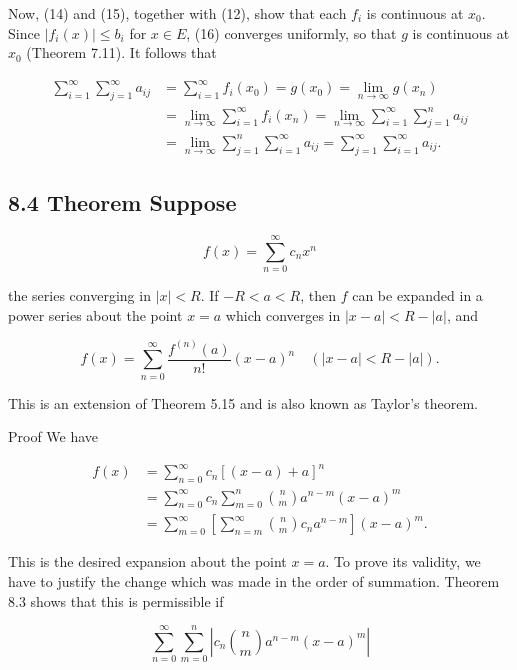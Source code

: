 \documentclass[10pt]{article}
\begin{document}
Now, (14) and (15), together with (12), show that each $f_{i}$ is continuous at $x_{0}$. Since $\left|f_{i}(x)\right| \leq b_{i}$ for $x \in E$, (16) converges uniformly, so that $g$ is continuous at $x_{0}$ (Theorem 7.11). It follows that

$$
\begin{aligned}
\sum_{i=1}^{\infty} \sum_{j=1}^{\infty} a_{i j} & =\sum_{i=1}^{\infty} f_{i}\left(x_{0}\right)=g\left(x_{0}\right)=\lim _{n \rightarrow \infty} g\left(x_{n}\right) \\
& =\lim _{n \rightarrow \infty} \sum_{i=1}^{\infty} f_{i}\left(x_{n}\right)=\lim _{n \rightarrow \infty} \sum_{i=1}^{\infty} \sum_{j=1}^{n} a_{i j} \\
& =\lim _{n \rightarrow \infty} \sum_{j=1}^{n} \sum_{i=1}^{\infty} a_{i j}=\sum_{j=1}^{\infty} \sum_{i=1}^{\infty} a_{i j} .
\end{aligned}
$$

\subsection*{8.4 Theorem Suppose}
$$
f(x)=\sum_{n=0}^{\infty} c_{n} x^{n}
$$

the series converging in $|x|<R$. If $-R<a<R$, then $f$ can be expanded in a power series about the point $x=a$ which converges in $|x-a|<R-|a|$, and


\begin{equation*}
f(x)=\sum_{n=0}^{\infty} \frac{f^{(n)}(a)}{n!}(x-a)^{n} \quad(|x-a|<R-|a|) . \tag{17}
\end{equation*}


This is an extension of Theorem 5.15 and is also known as Taylor's theorem.

Proof We have

$$
\begin{aligned}
f(x) & =\sum_{n=0}^{\infty} c_{n}[(x-a)+a]^{n} \\
& =\sum_{n=0}^{\infty} c_{n} \sum_{m=0}^{n}\binom{n}{m} a^{n-m}(x-a)^{m} \\
& =\sum_{m=0}^{\infty}\left[\sum_{n=m}^{\infty}\binom{n}{m} c_{n} a^{n-m}\right](x-a)^{m} .
\end{aligned}
$$

This is the desired expansion about the point $x=a$. To prove its validity, we have to justify the change which was made in the order of summation. Theorem 8.3 shows that this is permissible if


\begin{equation*}
\sum_{n=0}^{\infty} \sum_{m=0}^{n}\left|c_{n}\binom{n}{m} a^{n-m}(x-a)^{m}\right| \tag{18}
\end{equation*}
\end{document}
